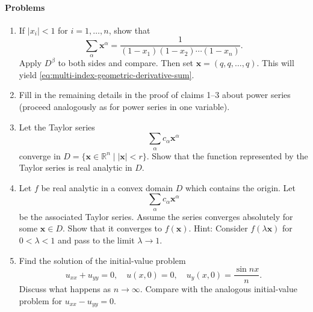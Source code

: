 \paragraph*{Problems}

\begin{enumerate}[label=\thesection.\arabic*.,ref=\thesection.\arabic*,start=7,series=book-problems]

\item\label{ex:multi-index-geometric-series-identity} If $|x_i|<1$ for $i=1,\ldots,n$, show that
\begin{equation}\label{eq:multivariable-geometric-product}
\sum_\alpha\bm{x}^{\alpha}=\dfrac1{(1-x_1)(1-x_2)\cdots(1-x_n)}.
\end{equation}
Apply $D^\beta$ to both sides and compare. Then set $\bm{x}=(q,q,\ldots,q)$. This will yield \eqref{eq:multi-index-geometric-derivative-sum}.

\item\label{ex:complete-power-series-facts} Fill in the remaining details in the proof of claims 1--3 about power series (proceed analogously as for power series in one variable).

\item\label{ex:taylor-series-real-analyticity} Let the Taylor series
\begin{equation}\label{eq:exercise-local-taylor-analyticity}
\sum_\alpha c_\alpha\bm{x}^{\alpha}
\end{equation}
converge in $D=\{\bm{x}\in\mathbb{R}^n\mid|\bm{x}|<r\}$. Show that the function represented by the Taylor series is real analytic in $D$.

\item\label{ex:analytic-taylor-convex-domain} Let $f$ be real analytic in a convex domain $D$ which contains the origin. Let
\begin{equation}\label{eq:exercise-convex-domain-taylor-series}
\sum_\alpha c_\alpha\bm{x}^{\alpha}
\end{equation}
be the associated Taylor series. Assume the series converges absolutely for some $\bm{x}\in D$. Show that it converges to $f(\bm{x})$. Hint: Consider $f(\lambda\bm{x})$ for $0<\lambda<1$ and pass to the limit $\lambda\to1$.

\item\label{ex:elliptic-cauchy-instability} Find the solution of the initial-value problem
\begin{equation}\label{eq:elliptic-cauchy-high-frequency-data}
u_{xx}+u_{yy}=0,\quad u(x,0)=0,\quad u_y(x,0)=\dfrac{\sin nx}{n}.
\end{equation}
Discuss what happens as $n\to\infty$. Compare with the analogous initial-value problem for $u_{xx}-u_{yy}=0$.


\end{enumerate}
